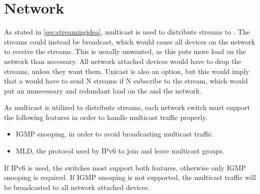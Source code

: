 \section{Network} \label{sec:analysis:network}

As stated in \ref{sec:streamingidea}, multicast is used to distribute streams to . The streams could instead be broadcast, which would cause all devices on the network to receive the streams. This is usually unwanted, as this puts more load on the network than necessary. All network attached devices would have to drop the streams, unless they want them. Unicast is also an option, but this would imply that a  would have to send N streams if N  subscribe to the stream, which would put an unnecessary and redundant load on the  and the network.

As multicast is utilized to distribute streams, each network switch must support the following features in order to handle multicast traffic properly.

\begin{itemize}
	 \item IGMP snooping, in order to avoid broadcasting multicast traffic.
	 \item MLD, the protocol used by IPv6 to join and leave multicast groups.
\end{itemize}
If IPv6 is used, the switches most support both features, otherwise only IGMP snooping is required. If IGMP snooping is not supported, the multicast traffic will be broadcasted to all network attached devices.

